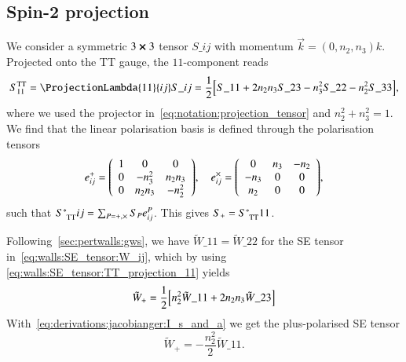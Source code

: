 \subsection{Spin-2 projection}\label{app:walls:SE_tensor:spin2}
    We consider a symmetric $3\cross 3$ tensor ${S}\_{ij}$ with momentum $\vec{k}=(0,n_2, n_3)k$. Projected onto the TT gauge, the $11$-component reads
    \begin{align}\label{eq:walls:SE_tensor:TT_projection_11}
        S\ap{TT}_{11} = \ProjectionLambda{11}{ij}S\_{ij} = \frac{1}{2}\bclosed{ S\_{11} + 2n_2 n_3 S\_{23} - n_3^2 S\_{22} - n_2^2 S\_{33}},
    \end{align}
    where we used the projector in~\cref{eq:notation:projection_tensor} and $n_2^2 + n_3^2 = 1$. %
    We find that the linear polarisation basis is defined through the polarisation tensors
    \begin{equation}\label{eq:walls:SE_tensor:linear_pol_basis}
        e\indices*{^+_{ij}}= %
        {\left(\begin{array}{ccc}
            1 & 0 & 0 \\
            0 & -n_3^2 & n_2 n_3 \\
            0 & n_2 n_3 & -n_2^2 
        \end{array}\right)},%
        \quad %
        e\indices*{^{\times}_{ij}} =
        {\left(\begin{array}{ccc}
            0 & n_3 & -n_2 \\
            -n_3 &0 & 0 \\
            n_2 & 0& 0
        \end{array}\right)}, %
    \end{equation}
    such that $S\iud*{\mathrm{TT}}{ij} = \sum_{P=+, \times} S_P e\indices*{^{P}_{ij}}$. This gives $S_+ = S\iud*{\mathrm{TT}}{11}$.

    Following~\cref{sec:pertwalls:gws}, we have $\tilde{W}\_{11} =  \tilde{W}\_{22} $ for the SE tensor in~\cref{eq:walls:SE_tensor:W_ij}, which by using \cref{eq:walls:SE_tensor:TT_projection_11} yields
    \begin{equation}\label{eq:walls:SE_tensor:W_plus_TT}
        \tilde{W}_+ = \frac{1}{2} {\left[  n_2^2 \tilde{W}\_{11} + 2 n_2 n_3 \tilde{W}\_{23}  \right]}
    \end{equation}
    With~\cref{eq:derivations:jacobianger:I_s_and_a} we get the plus-polarised SE tensor
    \begin{equation}\label{eq:walls:SE_tensor:W_plus_final}
        \tilde{W}_+  = - \frac{n_2^2 }{2}  \tilde{W}\_{11}.
    \end{equation}








